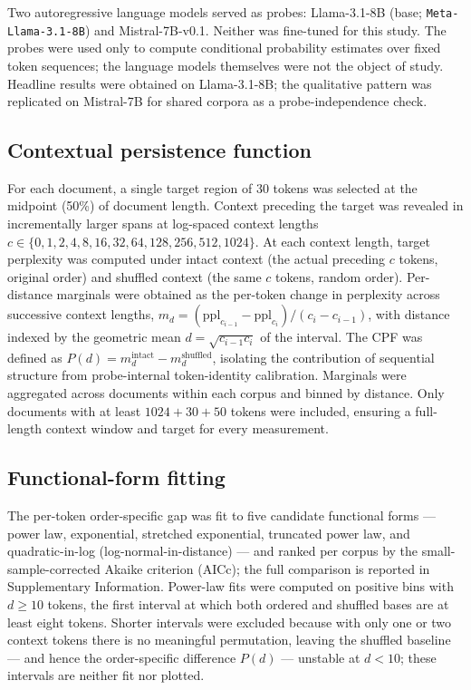 \documentclass[11pt]{article}
\begin{document}
Two autoregressive language models served as probes: Llama-3.1-8B (base;
\texttt{Meta-Llama-3.1-8B}) and Mistral-7B-v0.1. Neither was fine-tuned for this study. The
probes were used only to compute conditional probability estimates over fixed token sequences;
the language models themselves were not the object of study. Headline results were obtained on
Llama-3.1-8B; the qualitative pattern was replicated on Mistral-7B for shared corpora as a
probe-independence check.

\subsection{Contextual persistence function}

For each document, a single target region of 30 tokens was selected at the midpoint (50\%) of
document length. Context preceding the target was revealed in incrementally larger spans at
log-spaced context lengths $c \in \{0, 1, 2, 4, 8, 16, 32, 64, 128, 256, 512, 1024\}$. At each
context length, target perplexity was computed under intact context (the actual preceding $c$
tokens, original order) and shuffled context (the same $c$ tokens, random order). Per-distance
marginals were obtained as the per-token change in perplexity across successive context lengths,
$m_d = (\mathrm{ppl}_{c_{i-1}} - \mathrm{ppl}_{c_i}) / (c_i - c_{i-1})$, with distance indexed by
the geometric mean $d = \sqrt{c_{i-1} c_i}$ of the interval. The CPF was defined
as $P(d) = m_d^{\text{intact}} - m_d^{\text{shuffled}}$, isolating the contribution of sequential
structure from probe-internal token-identity calibration. Marginals were aggregated across
documents within each corpus and binned by distance. Only documents with at least
$1024 + 30 + 50$ tokens were included, ensuring a full-length context window and target for every
measurement.

\subsection{Functional-form fitting}

The per-token order-specific gap was fit to five candidate functional forms --- power law,
exponential, stretched exponential, truncated power law, and quadratic-in-log
(log-normal-in-distance) --- and ranked per corpus by the small-sample-corrected Akaike
criterion (AICc); the full comparison is reported in Supplementary Information. Power-law fits
were computed on positive bins with $d \geq 10$ tokens, the first interval at which both ordered
and shuffled bases are at least eight tokens. Shorter intervals were excluded because with only one or
two context tokens there is no meaningful permutation, leaving the shuffled baseline --- and hence
the order-specific difference $P(d)$ --- unstable at $d < 10$; these intervals are neither fit nor
plotted.
\end{document}
